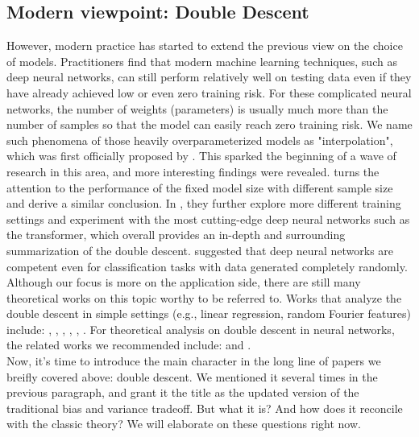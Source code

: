 \documentclass{article}
\begin{document}
\vspace{-2mm}
\subsection{Modern viewpoint: Double Descent}
\vspace{-1mm}
However, modern practice has started to extend the previous view on the choice of models. Practitioners find that modern machine learning techniques, such as deep neural networks, can still perform relatively well on testing data even if they have already achieved low or even zero training risk. For these complicated neural networks, the number of weights (parameters) is usually much more than the number of samples so that the model can easily reach zero training risk. We name such phenomena of those heavily overparameterized models as "interpolation", which was first officially proposed by \cite{belkin2019reconciling}. This sparked the beginning of a wave of research in this area, and more interesting findings were revealed. \cite{nakkiran2019more} turns the attention to the performance of the fixed model size with different sample size and derive a similar conclusion. In \cite{nakkiran2021deep}, they further explore more different training settings and experiment with the most cutting-edge deep neural networks such as the transformer, which overall provides an in-depth and surrounding summarization of the double descent. \cite{zhang2021understanding} suggested that deep neural networks are competent even for classification tasks with data generated completely randomly. Although our focus is more on the application side, there are still many theoretical works on this topic worthy to be referred to. Works that analyze the double descent in simple settings (e.g., linear regression, random Fourier features) include: \cite{Bartlett_Long_Lugosi_Tsigler_2019}, \cite{Muthukumar_Vodrahalli_Subramanian_Sahai_2019}, \cite{Mitra_2019}, \cite{Derezinski_Liang_Mahoney_2019}, \cite{Liang_Rakhlin_2020}, \cite{Mei_Montanari_2022}. For theoretical analysis on double descent in neural networks, the related works we recommended include: \cite{d2020double} and \cite{baldassi2021unveiling}.\\

\vspace{-3mm}
Now, it's time to introduce the main character in the long line of papers we breifly covered above: double descent. We mentioned it several times in the previous paragraph, and grant it the title as the updated version of the traditional bias and variance tradeoff. But what it is? And how does it reconcile with the classic theory? We will elaborate on these questions right now.\\
\end{document}
